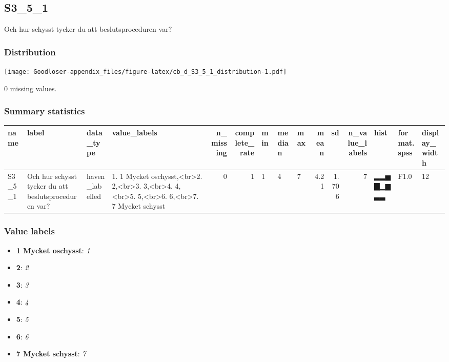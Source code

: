\documentclass[
]{book}
\providecommand{\tightlist}{%
  \setlength{\itemsep}{0pt}\setlength{\parskip}{0pt}}
\begin{document}
\hypertarget{S3_5_1}{%
\subsection{S3\_5\_1}\label{S3_5_1}}

Och hur schysst tycker du att beslutsproceduren var?

\hypertarget{S3_5_1_distribution}{%
\subsubsection{Distribution}\label{S3_5_1_distribution}}

\texttt{[image: Goodloser-appendix\_files/figure-latex/cb\_d\_S3\_5\_1\_distribution-1.pdf]}

0 missing values.

\hypertarget{S3_5_1_summary}{%
\subsubsection{Summary statistics}\label{S3_5_1_summary}}

\begin{tabular}{l|l|l|l|r|r|l|l|l|r|r|r|l|l|l}
\hline
name & label & data_type & value_labels & n_missing & complete_rate & min & median & max & mean & sd & n_value_labels & hist & format.spss & display_width\\
\hline
S3_5_1 & Och hur schysst tycker du att beslutsproceduren var? & haven_labelled & 1. 1 Mycket oschysst,<br>2. 2,<br>3. 3,<br>4. 4,<br>5. 5,<br>6. 6,<br>7. 7 Mycket schysst & 0 & 1 & 1 & 4 & 7 & 4.21 & 1.706 & 7 & ▂▂▅▇▁▆▃▃ & F1.0 & 12\\
\hline
\end{tabular}

\hypertarget{S3_5_1_labels}{%
\subsubsection{Value labels}\label{S3_5_1_labels}}

\begin{itemize}
\tightlist
\item
  \textbf{1 Mycket oschysst}: \emph{1}
\item
  \textbf{2}: \emph{2}
\item
  \textbf{3}: \emph{3}
\item
  \textbf{4}: \emph{4}
\item
  \textbf{5}: \emph{5}
\item
  \textbf{6}: \emph{6}
\item
  \textbf{7 Mycket schysst}: \emph{7}
\end{itemize}
\end{document}
